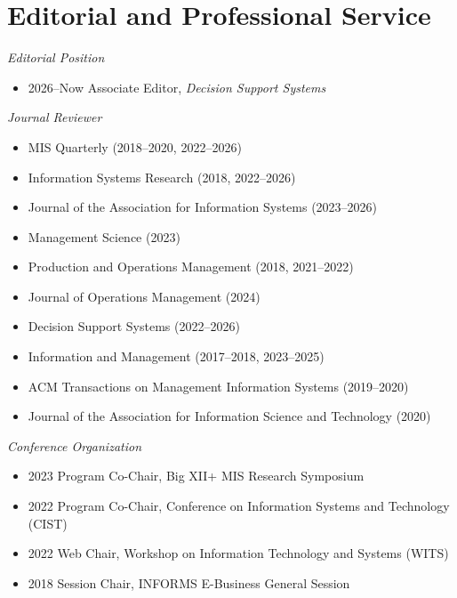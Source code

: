\documentclass[paper=letter,fontsize=10pt]{scrartcl} %
\newcommand{\NewPart}[2]{\section*{{#1} #2}}
\begin{document}
\NewPart{Editorial and Professional Service}{}

\noindent\textit{Editorial Position}
\begin{itemize}
\item 2026--Now \hspace{0.3em} Associate Editor, \textit{Decision Support Systems}
\end{itemize}

\noindent\textit{Journal Reviewer}
\begin{itemize}
\item MIS Quarterly (2018--2020, 2022--2026)
\item Information Systems Research (2018, 2022--2026)
\item Journal of the Association for Information Systems (2023--2026)
\item Management Science (2023)
\item Production and Operations Management (2018, 2021--2022)
\item Journal of Operations Management (2024)
\item Decision Support Systems (2022--2026)
\item Information and Management (2017--2018, 2023--2025)
\item ACM Transactions on Management Information Systems (2019--2020)
\item Journal of the Association for Information Science and Technology (2020)
\end{itemize}

\noindent\textit{Conference Organization}
\begin{itemize}
\item 2023 \hspace{0.3em} Program Co-Chair, Big XII+ MIS Research Symposium
\item 2022 \hspace{0.3em} Program Co-Chair, Conference on Information Systems and Technology (CIST)
\item 2022 \hspace{0.3em} Web Chair, Workshop on Information Technology and Systems (WITS)
\item 2018 \hspace{0.3em} Session Chair, INFORMS E-Business General Session
\end{itemize}
\end{document}
